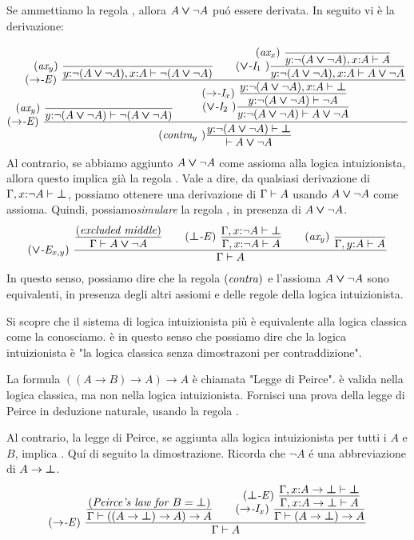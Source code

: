 \documentclass{article}
\begin{document}
Se ammettiamo la regola , allora $A\mathbin{\textrm{\rm\boldmath $\vee$}}\neg A$ pu\'o essere
derivata. In seguito vi \`e la derivazione:
{\footnotesize
	\[ \trule{$\to$-E}\ \deriv{\raisebox{-6ex}{$\squishr{\trule{ax$_y$}~}\deriv{}{\typ{y}{\neg(A\cor\neg A)}\tj\neg(A\cor\neg A)}$}\hspace{-24ex}
		\squishr{\trule{$\to$-E}~}\deriv{\squishr{\trule{ax$_y$}~}\deriv{}{\typ{y}{\neg(A\cor\neg A)},\typ{x}{A}\tj\neg(A\cor\neg A)}
			\sep \trule{$\cor$-I$_1$~}\deriv{\squishr{\trule{ax$_x$}~}\deriv{}{\typ{y}{\neg(A\cor\neg A)},\typ{x}{A}\tj A}}{\typ{y}{\neg(A\cor\neg A)},\typ{x}{A}\tj A\cor\neg A}}{
			\trule{$\cor$-I$_2$~}\deriv{ 
				\squishr{\trule{$\to$-I$_x$}~}\deriv{\typ{y}{\neg(A\cor\neg A)},\typ{x}{A}\tj \cfalse}{\typ{y}{\neg(A\cor\neg A)}\tj \neg A}
			}{\typ{y}{\neg(A\cor\neg A)}\tj A\cor \neg A}\hspace{-18ex}
	}}{\trule{contra$_y$~}\deriv{\typ{y}{\neg(A\cor\neg A)}\tj\cfalse}{\tj A\cor\neg A}}
	\]}
Al contrario, se abbiamo aggiunto $A\mathbin{\textrm{\rm\boldmath $\vee$}}\neg A$ come assioma alla logica intuizionista, allora questo implica gi\`a la regola   . Vale a dire, da qualsiasi derivazione di $\Gamma,x{:}\neg A\vdash\textrm{\rm\boldmath $\bot$}$, possiamo ottenere una derivazione di $\Gamma\vdash A$ usando $A\mathbin{\textrm{\rm\boldmath $\vee$}}\neg A$ come assioma. Quindi, possiamo{\em simulare} la regola , in presenza di
$A\mathbin{\textrm{\rm\boldmath $\vee$}}\neg A$.
\[ \trule{$\cor$-E$_{x,y}$}\ \deriv{\deriv{\trule{excluded middle}}{\Gamma\tj A\cor \neg A} \sep
	\trule{$\cfalse$-E}\ \deriv{ \Gamma,\typ{x}{\neg A}\tj\cfalse}{\Gamma,\typ{x}{\neg A}\tj A}
	\sep \trule{ax$_y$}\ \deriv{}{\Gamma,\typ{y}{A}\tj A}}{\Gamma\tj A}
\]
In questo senso, possiamo dire che la regola $\textrm{(\textit{contra\/})}$ e l'assioma
$A\mathbin{\textrm{\rm\boldmath $\vee$}}\neg A$ sono equivalenti, in presenza degli altri assiomi e delle regole della logica intuizionista.

Si scopre che il sistema di logica intuizionista pi\`u 
 \`e equivalente alla logica classica come la conosciamo. \`e in questo senso che possiamo dire che la logica intuizionista \`e "la logica classica senza dimostrazoni per contraddizione".

\begin{exercise}
	La formula $((A\to B)\to A)\to A$ \`e chiamata "Legge di Peirce". \`e valida nella logica classica, 
	ma non nella logica intuizionista. Fornisci una prova della legge di Peirce in deduzione naturale, usando la regola 
	.
\end{exercise}

Al contrario, la legge di Peirce, se aggiunta alla logica intuizionista per tutti i
$A$ e $B$, implica . Qu\'i di seguito la dimostrazione. Ricorda che 
$\neg A$ \'e una abbreviazione di $A\to\textrm{\rm\boldmath $\bot$}$.
\[ \trule{$\to$-E}~
\deriv{
	\deriv{\trule{Peirce's law for $B=\cfalse$}}
	{\Gamma\tj((A\to\cfalse)\to A)\to A}
	\sep
	\trule{$\to$-I$_x$}~
	\deriv{
		\squishr{\trule{$\cfalse$-E}~}
		\deriv{\Gamma,\typ{x}{A\to\cfalse}\tj\cfalse}
		{\Gamma,\typ{x}{A\to\cfalse}\tj A}
	}
	{\Gamma\tj(A\to\cfalse)\to A}
}
{\Gamma\tj A}
\]
\end{document}
